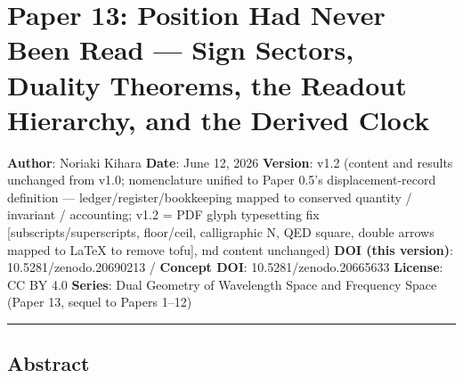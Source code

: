 \documentclass[
]{ltjsarticle}
\author{}
\date{}
\begin{document}
\section{Paper 13: Position Had Never Been Read --- Sign Sectors,
Duality Theorems, the Readout Hierarchy, and the Derived
Clock}\label{paper-13-position-had-never-been-read-sign-sectors-duality-theorems-the-readout-hierarchy-and-the-derived-clock}

\textbf{Author}: Noriaki Kihara \textbf{Date}: June 12, 2026
\textbf{Version}: v1.2 (content and results unchanged from v1.0;
nomenclature unified to Paper 0.5's displacement-record definition ---
ledger/register/bookkeeping mapped to conserved quantity / invariant /
accounting; v1.2 = PDF glyph typesetting fix {[}subscripts/superscripts,
floor/ceil, calligraphic N, QED square, double arrows mapped to LaTeX to
remove tofu{]}, md content unchanged) \textbf{DOI (this version)}:
10.5281/zenodo.20690213 / \textbf{Concept DOI}: 10.5281/zenodo.20665633
\textbf{License}: CC BY 4.0 \textbf{Series}: Dual Geometry of Wavelength
Space and Frequency Space (Paper 13, sequel to Papers 1--12)

\begin{center}\rule{0.5\linewidth}{0.5pt}\end{center}

\subsection{Abstract}\label{abstract}
\end{document}
